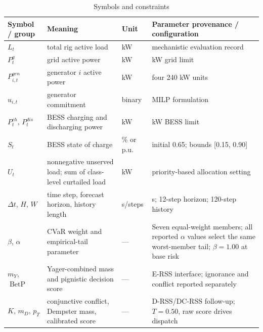 \begin{table}[!t]
\caption{Symbols and constraints}
\label{tab:symbols-constraints}
\centering
\footnotesize
\begin{tabular}{@{}
  >{\raggedright\arraybackslash}p{}
  >{\raggedright\arraybackslash}p{}
  >{\raggedleft\arraybackslash}p{}
  >{\raggedright\arraybackslash}p{}@{}}
\toprule
\begin{minipage}[b]{\linewidth}\raggedright
Symbol / group
\end{minipage} & \begin{minipage}[b]{\linewidth}\raggedright
Meaning
\end{minipage} & \begin{minipage}[b]{\linewidth}\raggedleft
Unit
\end{minipage} & \begin{minipage}[b]{\linewidth}\raggedright
Parameter provenance / configuration
\end{minipage} \\
\midrule
$L_t$ & total rig active load & kW & mechanistic evaluation record \\
$P^g_t$ & grid active power & kW & 1300 kW grid limit \\
$P^{gen}_{i,t}$ & generator $i$ active power & kW & four 240 kW units \\
$u_{i,t}$ & generator commitment & binary & MILP formulation \\
$P^{ch}_t$, $P^{dis}_t$ & BESS charging and discharging power & kW & 500 kW BESS limit \\
$S_t$ & BESS state of charge & \% or p.u. & initial 0.65; bounds [0.15, 0.90] \\
$U_t$ & nonnegative unserved load; sum of class-level curtailed load & kW & priority-based allocation setting \\
$\Delta t$, $H$, $W$ & time step, forecast horizon, history length & s/steps & 5 s; 12-step horizon; 120-step history \\
$\beta$, $\alpha$ & CVaR weight and empirical-tail parameter & --- & Seven equal-weight members; all reported $\alpha$ values select the same worst-member tail; $\beta=1.00$ at base risk \\
$m_Y$, $\operatorname{BetP}$ & Yager-combined mass and pignistic decision score & --- & E-RSS interface; ignorance and conflict reported separately \\
$K$, $m_D$, $p_T$ & conjunctive conflict, Dempster mass, calibrated score & --- & D-RSS/DC-RSS follow-up; $T=0.50$, raw score drives dispatch \\
\bottomrule
\end{tabular}
\end{table}

